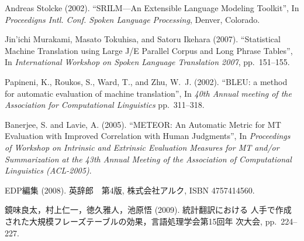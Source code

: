 \documentclass[japanese]{jnlp_1.4}
\begin{document}
\begin{thebibliography}{99}
 Andreas Stolcke (2002). ``SRILM---An Extensible Language
  Modeling Toolkit'', In \textit{Proceedigns Intl. Conf. Spoken Language Processing},
  Denver, Colorado.

Jin'ichi Murakami, Masato Tokuhisa, and Satoru Ikehara (2007). ``Statistical
Machine Translation using Large J/E Parallel Corpus and Long Phrase
Tables'', In \textit{International Workshop on Spoken Language Translation 2007},
pp.~151--155.

Papineni, K., Roukos, S., Ward, T., and Zhu, W.~J. (2002). 
``BLEU: a method for automatic evaluation of machine translation'', 
In \textit{40th Annual meeting of the Association for Computational Linguistics}
pp.~311--318.

 Banerjee, S. and Lavie, A. (2005). ``METEOR: An Automatic
  Metric for MT Evaluation with Improved Correlation with Human
  Judgments'', In \textit{Proceedings of Workshop on Intrinsic and Extrinsic
  Evaluation Measures for MT and/or Summarization at the 43th Annual
  Meeting of the Association of Computational Linguistics (ACL-2005)}.

EDP編集 (2008). 英辞郎　第4版, 株式会社アルク, ISBN 4757414560.

 鏡味良太，村上仁一，徳久雅人，池原悟 (2009). 統計翻訳における
  人手で作成された大規模フレーズテーブルの効果，言語処理学会第15回年
  次大会, pp.~224--227.

\end{thebibliography}



\begin{biography}


\end{biography}


\biodate
\end{document}
